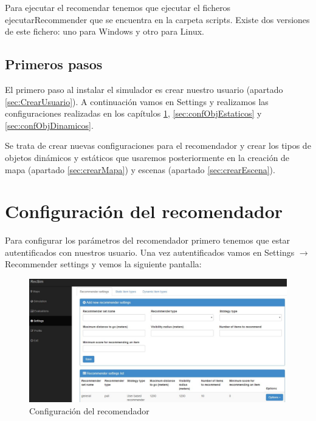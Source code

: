 Para ejecutar el recomendar tenemos que ejecutar el ficheros ejecutarRecommender que se encuentra en la carpeta scripts. Existe dos versiones de este fichero: uno para Windows y otro para Linux.

\subsection{Primeros pasos}

El primero paso al instalar el simulador es crear nuestro usuario (apartado \ref{sec:CrearUsuario}). A continuación vamos en Settings y realizamos las configuraciones realizadas en los capítulos \ref{sec:confRecomendador}, \ref{sec:confObjEstaticos} y \ref*{sec:confObjDinamicos}.

Se trata de crear nuevas configuraciones para el recomendador y crear los tipos de objetos dinámicos y estáticos que usaremos posteriormente en la creación de mapa (apartado \ref{sec:crearMapa}) y escenas (apartado \ref{sec:crearEscena}).

\section{Configuración del recomendador}\label{sec:confRecomendador}

Para configurar los parámetros del recomendador primero tenemos que estar autentificados con nuestros usuario. Una vez autentificados vamos en Settings $\rightarrow$ Recommender settings y vemos la siguiente pantalla:

\begin{figure}[H]
	\centering\includegraphics[scale=0.35]{imagenes/capitulo2/configuracion-recomendador.jpg}
	\caption{Configuración del recomendador}
	\label{img:ConfiguracionRecomendador}
\end{figure}


